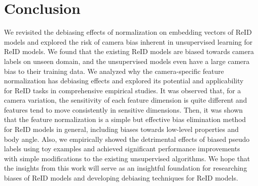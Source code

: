 \section{Conclusion}
\label{sec:conclusion}
We revisited the debiasing effects of normalization on embedding vectors of ReID models and explored the risk of camera bias inherent in unsupervised learning for ReID models.
We found that the existing ReID models are biased towards camera labels on unseen domain, and the unsupervised models even have a large camera bias to their training data.
We analyzed why the camera-specific feature normalization has debiasing effects and explored its potential and applicability for ReID tasks in comprehensive empirical studies.
It was observed that, for a camera variation, the sensitivity of each feature dimension is quite different and features tend to move consistently in sensitive dimensions.
Then, it was shown that the feature normalization is a simple but effective bias elimination method for ReID models in general, including biases towards low-level properties and body angle.
Also, we empirically showed the detrimental effects of biased pseudo labels using toy examples and achieved significant performance improvements with simple modifications to the existing unsupervised algorithms.
We hope that the insights from this work will serve as an insightful foundation for researching biases of ReID models and developing debiasing techniques for ReID models.
